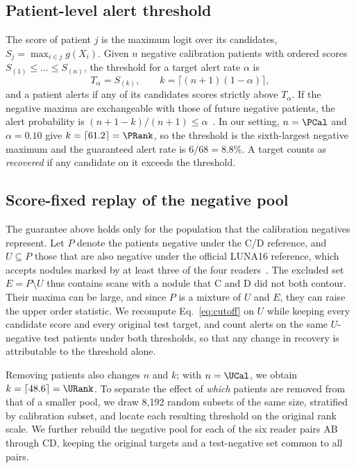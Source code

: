 \subsection{Patient-level alert threshold}
\label{sec:cutoff}

The score of patient $j$ is the maximum logit over its candidates, $S_j=\max_{i\in j}g(X_i)$. Given $n$ negative calibration patients with ordered scores $S_{(1)}\le\dots\le S_{(n)}$, the threshold for a target alert rate $\alpha$ is
\begin{equation}
 T_\alpha=S_{(k)},\qquad k=\lceil(n+1)(1-\alpha)\rceil ,
 \label{eq:cutoff}
\end{equation}
and a patient alerts if any of its candidates scores strictly above $T_\alpha$. If the negative maxima are exchangeable with those of future negative patients, the alert probability is $(n+1-k)/(n+1)\le\alpha$~\cite{angelopoulos2023conformal}. In our setting, $n=\PCal$ and $\alpha=0.10$ give $k=\lceil 61.2\rceil=\PRank$, so the threshold is the sixth-largest negative maximum and the guaranteed alert rate is $6/68=8.8\%$. A target counts as \emph{recovered} if any candidate on it exceeds the threshold.

\subsection{Score-fixed replay of the negative pool}
\label{sec:replay}

The guarantee above holds only for the population that the calibration negatives represent. Let $P$ denote the patients negative under the C/D reference, and $U\subseteq P$ those that are also negative under the official LUNA16 reference, which accepts nodules marked by at least three of the four readers~\cite{setio2017}. The excluded set $E=P\setminus U$ thus contains scans with a nodule that C and D did not both contour. Their maxima can be large, and since $P$ is a mixture of $U$ and $E$, they can raise the upper order statistic. We recompute Eq.~\eqref{eq:cutoff} on $U$ while keeping every candidate score and every original test target, and count alerts on the same $U$-negative test patients under both thresholds, so that any change in recovery is attributable to the threshold alone.

Removing patients also changes $n$ and $k$; with $n=\UCal$, we obtain $k=\lceil 48.6\rceil=\URank$. To separate the effect of \emph{which} patients are removed from that of a smaller pool, we draw 8,192 random subsets of the same size, stratified by calibration subset, and locate each resulting threshold on the original rank scale. We further rebuild the negative pool for each of the six reader pairs AB through CD, keeping the original targets and a test-negative set common to all pairs.

